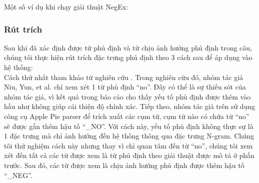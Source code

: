 Một số ví dụ khi chạy giải thuật NegEx:


\subsubsection*{Rút trích}
Sau khi đã xác định được từ phủ định và từ chịu ảnh hưởng phủ định trong câu, chúng tôi thực hiện rút trích đặc trưng phủ định theo 3 cách sau để áp dụng vào hệ thống:\\


Cách thứ nhất tham khảo từ nghiên cứu \cite{niu2005analysis}. Trong nghiên cứu đó, nhóm tác giả Niu, Yun, et al. chỉ xem xét 1 từ phủ định ``no''. Đây có thể là sự thiếu sót của nhóm tác giả, vì kết quả trong báo cáo \cite{niu2005analysis} cho thấy yếu tố phủ định được thêm vào hầu như không giúp cải thiện độ chính xác. Tiếp theo, nhóm tác giả trên sử dụng công cụ Apple Pie parser để trích xuất các cụm từ, cụm từ nào có chứa từ ``no'' sẽ được gắn thêm hậu tố ``\_NO''. Với cách này, yếu tố phủ định không thực sự là 1 đặc trưng mà chỉ ảnh hưởng đến hệ thống thông qua đặc trưng N-gram. Chúng tôi thử nghiệm cách này nhưng thay vì chỉ quan tâm đến từ ``no'', chúng tôi xem xét đến tất cả các từ được xem là từ phủ định theo giải thuật được mô tả ở phần trước. Sau đó, các từ được xem là chịu ảnh hưởng phủ định được thêm hậu tố ``\_NEG''.


